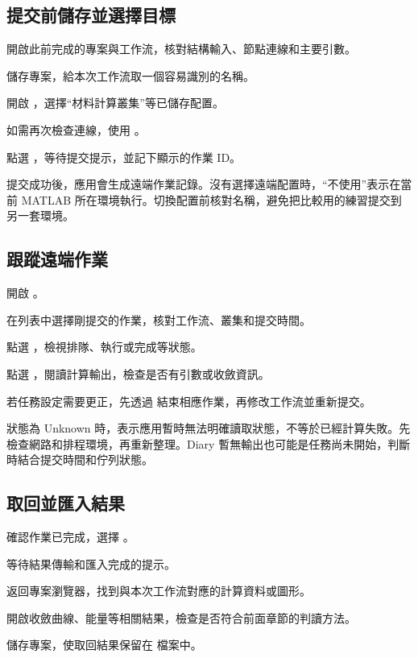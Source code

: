 \subsection{提交前儲存並選擇目標}

\begin{steps}
\item 開啟此前完成的專案與工作流，核對結構輸入、節點連線和主要引數。
\item 儲存專案，給本次工作流取一個容易識別的名稱。
\item 開啟 ，選擇“材料計算叢集”等已儲存配置。
\item 如需再次檢查連線，使用 。
\item 點選 ，等待提交提示，並記下顯示的作業 ID。
\end{steps}

提交成功後，應用會生成遠端作業記錄。沒有選擇遠端配置時，“不使用”表示在當前 MATLAB\regmark{} 所在環境執行。切換配置前核對名稱，避免把比較用的練習提交到另一套環境。

\subsection{跟蹤遠端作業}

\begin{steps}
\item 開啟 。
\item 在列表中選擇剛提交的作業，核對工作流、叢集和提交時間。
\item 點選 ，檢視排隊、執行或完成等狀態。
\item 點選 ，閱讀計算輸出，檢查是否有引數或收斂資訊。
\item 若任務設定需要更正，先透過  結束相應作業，再修改工作流並重新提交。
\end{steps}

狀態為 Unknown 時，表示應用暫時無法明確讀取狀態，不等於已經計算失敗。先檢查網路和排程環境，再重新整理。Diary 暫無輸出也可能是任務尚未開始，判斷時結合提交時間和佇列狀態。


\subsection{取回並匯入結果}

\begin{steps}
\item 確認作業已完成，選擇 。
\item 等待結果傳輸和匯入完成的提示。
\item 返回專案瀏覽器，找到與本次工作流對應的計算資料或圖形。
\item 開啟收斂曲線、能量等相關結果，檢查是否符合前面章節的判讀方法。
\item 儲存專案，使取回結果保留在  檔案中。
\end{steps}

